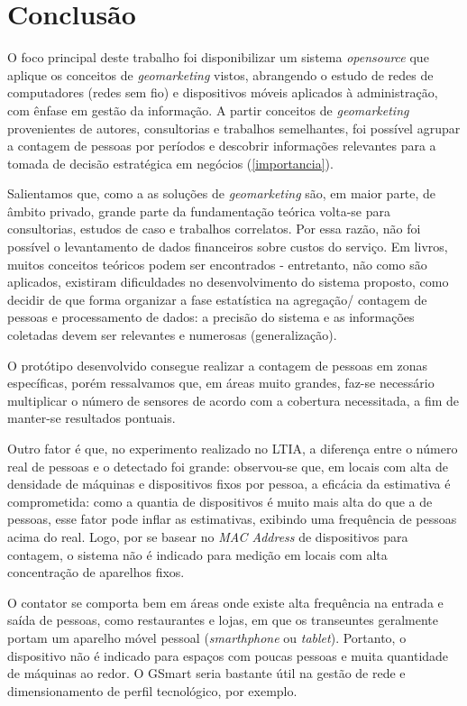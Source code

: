 \chapter{Conclusão}
\label{conclusao}

O foco principal deste trabalho foi disponibilizar um sistema \emph{opensource}
que aplique os conceitos de \emph{geomarketing} vistos, abrangendo o estudo de
redes de computadores (redes sem fio) e dispositivos móveis aplicados à
administração, com ênfase em gestão da informação. A partir conceitos de
\emph{geomarketing} provenientes de autores, consultorias e trabalhos
semelhantes, foi possível agrupar a contagem de pessoas por períodos e descobrir
informações relevantes para a tomada de decisão estratégica em negócios
(\autoref{importancia}).

Salientamos que, como a as soluções de \emph{geomarketing}
são, em maior parte, de âmbito privado, grande parte da fundamentação teórica
volta-se para consultorias, estudos de caso e trabalhos correlatos. Por essa
razão, não foi possível o levantamento de dados financeiros sobre custos do serviço. Em livros, muitos conceitos teóricos podem ser encontrados -
entretanto, não como são aplicados, existiram dificuldades no desenvolvimento do
sistema proposto, como decidir de que forma organizar a fase estatística na
agregação/ contagem de pessoas e processamento de dados: a precisão do sistema e
as informações coletadas devem ser relevantes e numerosas (generalização).

O protótipo desenvolvido consegue realizar a contagem de pessoas em zonas
específicas, porém ressalvamos que, em áreas muito grandes, faz-se necessário
multiplicar o número de sensores de acordo com a cobertura necessitada, a fim de
manter-se resultados pontuais. 

Outro fator é que, no experimento realizado no LTIA, a diferença entre o número real de pessoas e o detectado foi grande:  observou-se que, em locais com alta de densidade de máquinas e dispositivos fixos por pessoa, a eficácia da estimativa é comprometida: como a quantia de dispositivos é muito mais alta do que a de pessoas, esse fator pode inflar as estimativas, exibindo uma frequência de
pessoas acima do real. Logo, por se basear no \emph{MAC Address} de dispositivos
para contagem, o sistema não é indicado para medição em locais com alta
concentração de aparelhos fixos. 

O contator se comporta bem em áreas onde existe alta frequência na entrada e saída de pessoas, como
restaurantes e lojas, em que os transeuntes geralmente portam um aparelho móvel
pessoal (\emph{smarthphone} ou \emph{tablet}). Portanto, o dispositivo não é indicado para espaços com poucas pessoas e muita quantidade de máquinas ao redor. O GSmart seria bastante útil na gestão de rede e dimensionamento de perfil tecnológico, por exemplo.

